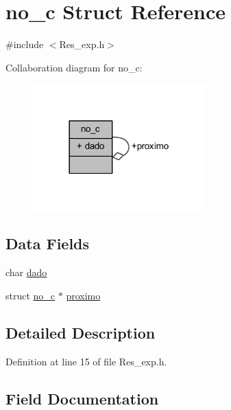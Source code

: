 \hypertarget{structno__c}{}\section{no\+\_\+c Struct Reference}
\label{structno__c}


{\ttfamily \#include $<$Res\+\_\+exp.\+h$>$}



Collaboration diagram for no\+\_\+c\+:
\nopagebreak
\begin{figure}[H]
\begin{center}
\leavevmode
\includegraphics[width=189pt]{structno__c__coll__graph}
\end{center}
\end{figure}
\subsection*{Data Fields}
\begin{DoxyCompactItemize}
\item 
char \mbox{\hyperlink{structno__c_ad8f3850ac3a21b7cd8ed98c5e81ff158}{dado}}
\item 
struct \mbox{\hyperlink{structno__c}{no\+\_\+c}} $\ast$ \mbox{\hyperlink{structno__c_ae377ca56965f4c6b7ce1ed7b465bc7e9}{proximo}}
\end{DoxyCompactItemize}


\subsection{Detailed Description}


Definition at line 15 of file Res\+\_\+exp.\+h.



\subsection{Field Documentation}
\mbox{\label{structno__c_ad8f3850ac3a21b7cd8ed98c5e81ff158}} 

